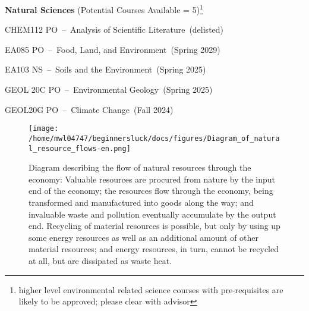\documentclass{article}\usepackage[]{graphicx}\usepackage[]{xcolor}
\newenvironment{itemize*}%
  {\begin{itemize}%
    \setlength{\itemsep}{0pt}%
    \setlength{\parskip}{0pt}}%
  {\end{itemize}}
\begin{document}
\begin{description}



  
\noindent\textbf{ Natural Sciences} (Potential Courses Available = 5)\footnote{higher level environmental related science courses with pre-requisites are likely to be approved; please clear with advisor}

\begin{itemize*}
  \item CHEM112 PO~--~Analysis of Scientific Literature~(delisted)
  \item EA085 PO~--~Food, Land, and Environment~(Spring 2029)
  \item EA103 NS~--~Soils and the Environment~(Spring 2025)
  \item GEOL 20C PO~--~Environmental Geology~(Spring 2025)
  \item GEOL20G PO~--~Climate Change~(Fall 2024)
\end{itemize*}

\end{description}



\begin{figure}
\centering
\texttt{[image: /home/mwl04747/beginnersluck/docs/figures/Diagram\_of\_natural\_resource\_flows-en.png]}
\caption{Diagram describing the flow of natural resources through the economy: Valuable resources are procured from nature by the input end of the economy; the resources flow through the economy, being transformed and manufactured into goods along the way; and invaluable waste and pollution eventually accumulate by the output end. Recycling of material resources is possible, but only by using up some energy resources as well as an additional amount of other material resources; and energy resources, in turn, cannot be recycled at all, but are dissipated as waste heat.}
\end{figure}
\end{document}
